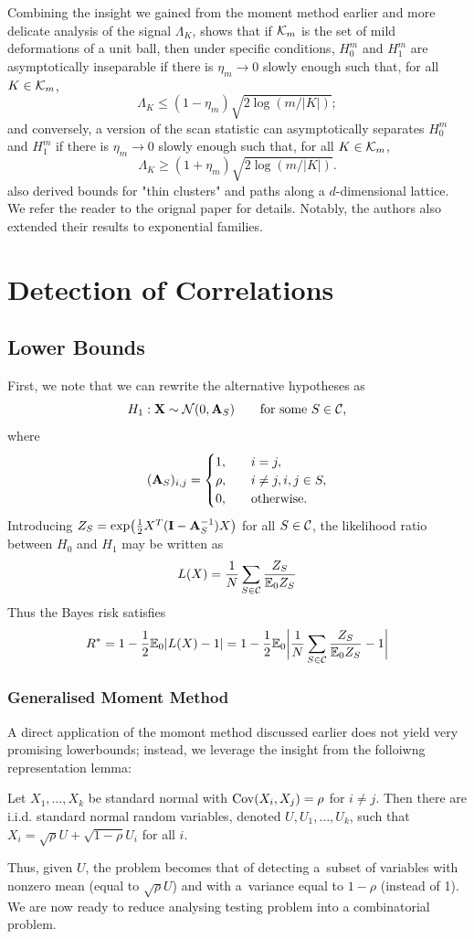 \documentclass[10pt, oneside]{article}
\begin{document}
Combining the insight we gained from the moment method earlier and more delicate analysis of the signal $\Lambda_K$, \cite{arias2011detection} shows that if ${\mathcal K}_m$ is the set of mild deformations of a unit ball, then under specific conditions,
$H_0^m$ and $H_1^m$ are asymptotically inseparable if there is
$\eta_m \to0$ slowly enough such that, for all $K \in{\mathcal K}_m$,
%
\[
\Lambda_K \leq(1 - \eta_m) \sqrt{2 \log(m/|K|)};
\]
%
and conversely, a version of the scan statistic can asymptotically separates $H_0^m$ and $H_1^m$ if there is $\eta_m
\to0$ slowly enough such that, for all $K \in{\mathcal K}_m$,
%
\[
\Lambda_K \geq(1 + \eta_m) \sqrt{2 \log(m/|K|)}.
\]
\cite{arias2011detection} also derived bounds for "thin clusters" and paths along a $d$-dimensional lattice. We refer the reader to the orignal paper for details. Notably, the authors also extended their results to exponential families.

\section{Detection of Correlations}
\subsection{Lower Bounds}
First, we note that we can rewrite the alternative hypotheses as $$H_1: \mathbf{X} \sim{\mathcal N}(0,\mathbf{A}_S)\qquad\mbox{for some $S \in{\mathcal C}$,}$$ where
$$(\mathbf{A}_S)_{i,j} = \begin{cases}
1, &\quad i = j, \cr
\rho, &\quad i \neq j, i, j \in S, \cr
0, &\quad \text{otherwise}.
\end{cases}$$
Introducing $Z_S = \exp\bigl(\tfrac{1}{2} X^T (\mathbf{I}- \mathbf{A}_S^{-1}) X \bigr)$ for all $S \in{\mathcal C}$, the likelihood ratio between $H_0$ and $H_1$ may be written as $$L(X) = \frac{1}{N} \sum_{S \in{\mathcal C}} \frac{Z_S}{\mathbb{E}_0 Z_S}$$ Thus the Bayes risk satisfies
$$R^* = 1 - \frac{1}{2} \mathbb{E}_0 |L(X) - 1| = 1 - \frac{1}{2} \mathbb{E}_0\biggl| \frac{1}{N} \sum_{S \in{\mathcal C}} \frac{Z_S}{\mathbb{E}_0 Z_S} - 1\biggr|$$

\subsubsection{Generalised Moment Method}
A direct application of the momont method discussed earlier does not yield very promising lowerbounds; instead, we leverage the insight from the folloiwng representation lemma:
\begin{lem}
  \label{lemrepresent}
  Let $X_1,\ldots, X_k$ be standard normal with $\operatorname{Cov}(X_i, X_j) = \rho
  $ for $i \neq j$. Then there are i.i.d. standard normal random
  variables, denoted $U, U_1,\ldots, U_k$, such that $X_i = \sqrt{\rho}
  U + \sqrt{1-\rho}   U_i$ for all $i$.
\end{lem}
Thus, given $U$, the problem becomes that of detecting a~subset of
variables with nonzero mean (equal to $\sqrt{\rho} U$) and with a~variance equal to $1-\rho$ (instead of 1). We are now ready to reduce analysing testing problem into a combinatorial problem.
\end{document}
